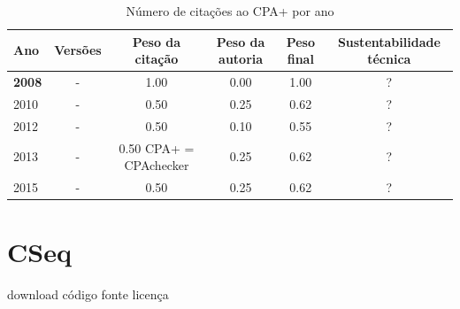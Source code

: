 \begin{table}[H]
\caption{Número de citações ao CPA+  por ano}
\centering
\begin{tabular}{| l | c | c | c | c | c |}
  \hline
  Ano & Versões & Peso da citação & Peso da autoria & Peso final & Sustentabilidade técnica \\
  \hline
            {\bf 2008}
          &
          -
          &
          1.00
          &
          0.00
          &
            {\color{blue} 1.00}
          &
          ?
          \\
\hline
            2010
          &
          -
          &
          0.50
          &
          0.25
          &
            {\color{blue} 0.62}
          &
          ?
          \\
\hline
            2012
          &
          -
          &
          0.50
          &
          0.10
          &
            {\color{blue} 0.55}
          &
          ?
          \\
\hline
            2013
          &
          -
          &
          0.50
            {\tiny CPA+ = CPAchecker}
          &
          0.25
          &
            {\color{blue} 0.62}
          &
          ?
          \\
\hline
            2015
          &
          -
          &
          0.50
          &
          0.25
          &
            {\color{blue} 0.62}
          &
          ?
          \\
\hline
\end{tabular}
\end{table}



\section{CSeq}
\checkmark download
\checkmark código fonte
\checkmark licença



